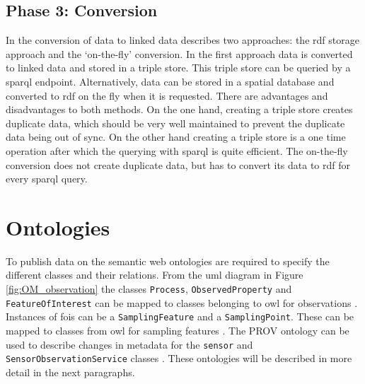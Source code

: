 \subsection{Phase 3: Conversion}
In the conversion of data to linked data \cite{LD:Missier} describes two approaches: the \ac{rdf} storage approach and the `on-the-fly' conversion. In the first approach data is converted to linked data and stored in a triple store. This triple store can be queried by a \ac{sparql} endpoint. Alternatively, data can be stored in a spatial database and converted to \ac{rdf} on the fly when it is requested. There are advantages and disadvantages to both methods. On the one hand, creating a triple store creates duplicate data, which should be very well maintained to prevent the duplicate data being out of sync. On the other hand creating a triple store is a one time operation after which the querying with \ac{sparql} is quite efficient. The on-the-fly conversion does not create duplicate data, but has to convert its data to \ac{rdf} for every \ac{sparql} query.

\section{Ontologies}
\label{par:ontologies2}
\begin{sloppypar}
To publish data on the semantic web ontologies are required to specify the different classes and their relations. From the \ac{uml} diagram in Figure \ref{fig:OM_observation} the classes \texttt{Process}, \texttt{ObservedProperty} and \texttt{FeatureOfInterest} can be mapped to classes belonging to \ac{owl} for observations \citep{SSW:Cox}. Instances of \acp{foi} can be a \texttt{SamplingFeature} and a \texttt{SamplingPoint}. These can be mapped to classes from \ac{owl} for sampling features \citep{SSW:Cox2}. The PROV ontology can be used to describe changes in metadata for the \texttt{sensor} and \texttt{SensorObservationService} classes \citep{LD:W3C2}. These ontologies will be described in more detail in the next paragraphs.
\end{sloppypar}

